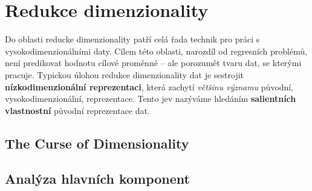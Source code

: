 \section{Redukce dimenzionality}
\label{sec:dimensionality_reduction}

Do oblasti reducke dimenzionality patří celá řada technik pro práci s vysokodimenzionálními daty.
Cílem této oblasti, narozdíl od regresních problémů, není predikovat hodnotu cílové proměnné – ale porozumět tvaru dat, se kterými pracuje.
Typickou úlohou redukce dimenzionality dat je sestrojit \textbf{nízkodimenzionální reprezentaci}, která zachytí \emph{většinu významu} původní, vysokodimenzionální, reprezentace.
Tento jev nazýváme hledáním \textbf{salientních vlastnostní} původní reprezentace dat. \cite{Phillips2021}

\subsection{The Curse of Dimensionality}
\subsection{Analýza hlavních komponent}
\label{sec:pca}